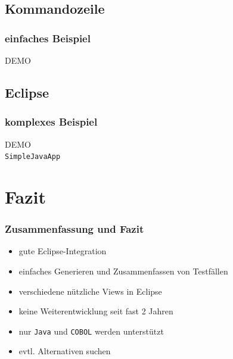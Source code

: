 \documentclass{beamer}
\begin{document}
  \subsection{Kommandozeile}
  \begin{frame}\frametitle{einfaches Beispiel}
    \centering \Huge{DEMO}\\
  \end{frame}

  \subsection{Eclipse}
  \begin{frame}\frametitle{komplexes Beispiel}
    \centering
    \Huge{DEMO}\\
    \centering
    \normalsize{\texttt{SimpleJavaApp}}\\
  \end{frame}


  \section{Fazit}
  \begin{frame}\frametitle{Zusammenfassung und Fazit}
    \begin{itemize}
      \item gute Eclipse-Integration
      \item einfaches Generieren und Zusammenfassen von Testfällen
      \item verschiedene nützliche Views in Eclipse
      \item keine Weiterentwicklung seit fast 2 Jahren
      \item nur \texttt{Java} und \texttt{COBOL} werden unterstützt
      \item evtl. Alternativen suchen
    \end{itemize}
  \end{frame}
\end{document}
